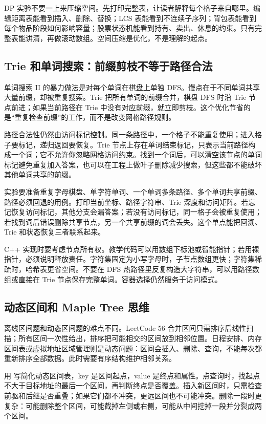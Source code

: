 DP 实验不要一上来压缩空间。先打印完整表，让读者解释每个格子来自哪里。编辑距离表能看到插入、删除、替换；LCS 表能看到不连续子序列；背包表能看到每个物品阶段如何影响容量；股票状态机能看到持有、卖出、休息的约束。只有完整表能讲清，再做滚动数组。空间压缩是优化，不是理解的起点。

\subsection{Trie 和单词搜索：前缀剪枝不等于路径合法}

单词搜索 II 的暴力做法是对每个单词在棋盘上单独 DFS。慢点在于不同单词共享大量前缀，却被重复搜索。Trie 把所有单词的前缀合并，棋盘 DFS 时沿 Trie 节点前进；如果当前路径在 Trie 中没有对应前缀，就立即剪枝。这个优化节省的是“重复检查前缀”的工作，而不是改变网格路径规则。

路径合法性仍然由访问标记控制。同一条路径中，一个格子不能重复使用；进入格子要标记，递归返回要恢复。Trie 节点上存在单词结束标记，只表示当前路径构成一个词；它不允许你忽略网格访问约束。找到一个词后，可以清空该节点的单词标记避免重复加入答案，也可以在工程上做叶子删除减少搜索，但这些都不能破坏其他单词共享的前缀。

实验要准备重复字母棋盘、单字符单词、一个单词多条路径、多个单词共享前缀、路径必须回退的用例。打印当前坐标、路径字符串、Trie 深度和访问矩阵。若忘记恢复访问标记，其他分支会漏答案；若没有访问标记，同一格子会被重复使用；若找到词后错误删除共享节点，另一个共享前缀的词会丢失。这个单点能把回溯、Trie 和状态恢复三者联系起来。

C++ 实现时要考虑节点所有权。教学代码可以用数组下标池或智能指针；若用裸指针，必须说明释放责任。字符集固定为小写字母时，子节点数组更快；字符集稀疏时，哈希表更省空间。不要在 DFS 热路径里反复构造大字符串，可以用路径数组或直接在 Trie 节点保存完整单词。容器选择仍然服务于访问模式。

\subsection{动态区间和 Maple Tree 思维}

离线区间题和动态区间题的难点不同。LeetCode 56 合并区间只需排序后线性扫描；所有区间一次性给出，排序把可能相交的区间放到相邻位置。日程安排、内存区间表或虚拟地址区域管理则是动态问题：区间会插入、删除、查询，不能每次都重新排序全部数据。此时需要有序结构维护相邻关系。

用  写简化动态区间表，key 是区间起点，value 是终点和属性。点查询时，找起点不大于目标地址的最后一个区间，再判断终点是否覆盖。插入新区间时，只需检查前驱和后继是否重叠；如果它们都不冲突，更远区间也不可能冲突。删除一段时更复杂：可能删除整个区间，可能截掉左侧或右侧，可能从中间挖掉一段并分裂成两个区间。

